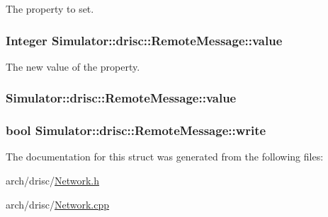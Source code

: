 The property to set. 

\hypertarget{struct_simulator_1_1drisc_1_1_remote_message_afdb82bab9cf2c0abd0c7b8a822dd36e0}{
\subsubsection[{value}]{\setlength{\rightskip}{0pt plus 5cm}Integer Simulator\+::drisc\+::\+Remote\+Message\+::value}}\label{struct_simulator_1_1drisc_1_1_remote_message_afdb82bab9cf2c0abd0c7b8a822dd36e0}


The new value of the property. 

\hypertarget{struct_simulator_1_1drisc_1_1_remote_message_a0604f1ed4e7d3f84c99822ca3339bddd}{
\subsubsection[{value}]{ Simulator\+::drisc\+::\+Remote\+Message\+::value}}\label{struct_simulator_1_1drisc_1_1_remote_message_a0604f1ed4e7d3f84c99822ca3339bddd}
\hypertarget{struct_simulator_1_1drisc_1_1_remote_message_a47e9a8987951bc258cee7480d94205d6}{
\subsubsection[{write}]{\setlength{\rightskip}{0pt plus 5cm}bool Simulator\+::drisc\+::\+Remote\+Message\+::write}}\label{struct_simulator_1_1drisc_1_1_remote_message_a47e9a8987951bc258cee7480d94205d6}


The documentation for this struct was generated from the following files\+:\begin{DoxyCompactItemize}
\item 
arch/drisc/\hyperlink{_network_8h}{Network.\+h}\item 
arch/drisc/\hyperlink{_network_8cpp}{Network.\+cpp}\end{DoxyCompactItemize}
